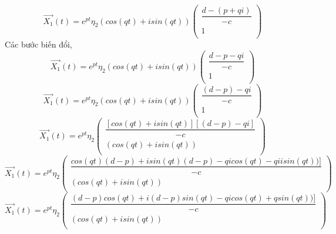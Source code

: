 \documentclass[class=article, crop=false]{standalone}
\begin{document}
    \begin{equation*}
        \vec{X_1}(t)=
        e^{pt}\eta_2
        (cos(qt) + i sin(qt))
        \begin{pmatrix}
            \dfrac{d - (p + qi)}{-c} \\
            1 \\
        \end{pmatrix}
    \end{equation*}
    Các bước biến đổi,
    \begin{equation*}
        \vec{X_1}(t)=
        e^{pt}\eta_2
        (cos(qt) + i sin(qt))
        \begin{pmatrix}
            \dfrac{d - p - qi}{-c} \\
            1 \\
        \end{pmatrix}
    \end{equation*}
    \begin{equation*}
        \vec{X_1}(t)=
        e^{pt}\eta_2
        (cos(qt) + i sin(qt))
        \begin{pmatrix}
            \dfrac{(d - p) - qi}{-c} \\
            1 \\
        \end{pmatrix}
    \end{equation*}
    \begin{equation*}
        \vec{X_1}(t)=
        e^{pt}\eta_2
        \begin{pmatrix}
            \dfrac{[cos(qt) + i sin(qt)][(d - p) - qi]}{-c} \\
            (cos(qt) + i sin(qt)) \\
        \end{pmatrix}
    \end{equation*}
    \begin{equation*}
        \vec{X_1}(t)=
        e^{pt}\eta_2
        \begin{pmatrix}
            \dfrac{cos(qt)(d - p) + i sin(qt)(d - p) - q i cos(qt) - q i i sin(qt)) ]}{-c} \\
            (cos(qt) + i sin(qt)) \\
        \end{pmatrix}
    \end{equation*}
    \begin{equation*}
        \vec{X_1}(t)=
        e^{pt}\eta_2
        \begin{pmatrix}
            \dfrac{(d - p)cos(qt) + i (d - p) sin(qt) - q i cos(qt) + q sin(qt)) ]}{-c} \\
            (cos(qt) + i sin(qt)) \\
        \end{pmatrix}
    \end{equation*}
\end{document}
